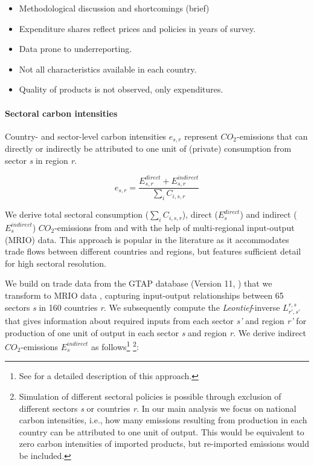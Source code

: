 \documentclass[12pt, a4paper]{article}
\begin{document}
\begin{itemize}
    \item Methodological discussion and shortcomings (brief)
    \item Expenditure shares reflect prices and policies in years of survey. 
    \item Data prone to underreporting.
    \item Not all characteristics available in each country.
    \item Quality of products is not observed, only expenditures. 
\end{itemize}


\paragraph{Sectoral carbon intensities} Country- and sector-level carbon intensities $e_{s,r}$ represent $CO_{2}$-emissions that can directly or indirectly be attributed to one unit of (private) consumption from sector \textit{s} in region \textit{r}.

\begin{equation}
    e_{s,r} = \frac{E_{s,r}^{direct}+E_{s,r}^{indirect}}{\sum_{i} C_{i,s,r}}
\end{equation}

We derive total sectoral consumption ($\sum_{i} C_{i,s,r}$), direct ($E_{s}^{direct}$) and indirect ($E_{s}^{indirect}$) $CO_{2}$-emissions from and with the help of multi-regional input-output (MRIO) data. This approach is popular in the literature as it accommodates trade flows between different countries and regions, but features sufficient detail for high sectoral resolution. 

We build on trade data from the GTAP database (Version 11,  \textcite{Aguiar.2022}) that we transform to MRIO data \autocite{Peters.2011}, capturing input-output relationships between 65 sectors \textit{s} in 160 countries \textit{r}. We subsequently compute the \textit{Leontief}-inverse $L_{r',s'}^{r,s}$ that gives information about required inputs from each sector \textit{s'} and region \textit{r'} for production of one unit of output in each sector \textit{s} and region \textit{r}. We derive indirect $CO_{2}$-emissions $E_{s}^{indirect}$ as follows\footnote{See \textcite{Missbach.2023b, Steckel.2021b,Feindt.2021,VogtSchilb.2019} for a detailed description of this approach.} \footnote{Simulation of different sectoral policies is possible through exclusion of different sectors \textit{s} or countries \textit{r}. In our main analysis we focus on national carbon intensities, i.e., how many emissions resulting from production in each country can be attributed to one unit of output. This would be equivalent to zero carbon intensities of imported products, but re-imported emissions would be included.}:
\end{document}
